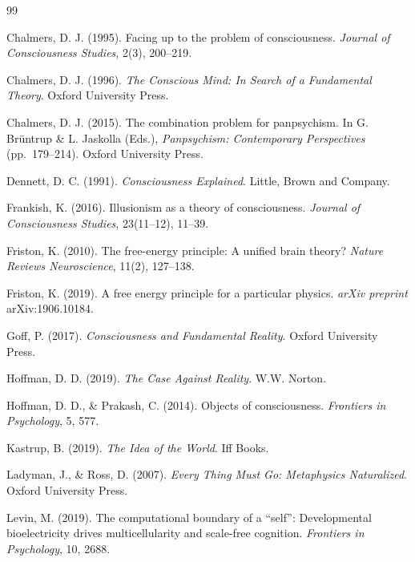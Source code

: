 \documentclass[11pt,a4paper]{article}
\theoremstyle{definition}
\theoremstyle{plain}
\theoremstyle{remark}
\begin{document}
\begin{thebibliography}{99}

 Chalmers, D. J. (1995). Facing up to the problem of consciousness. \textit{Journal of Consciousness Studies}, 2(3), 200--219.

 Chalmers, D. J. (1996). \textit{The Conscious Mind: In Search of a Fundamental Theory}. Oxford University Press.

 Chalmers, D. J. (2015). The combination problem for panpsychism. In G. Br\"untrup \& L. Jaskolla (Eds.), \textit{Panpsychism: Contemporary Perspectives} (pp.~179--214). Oxford University Press.

 Dennett, D. C. (1991). \textit{Consciousness Explained}. Little, Brown and Company.

 Frankish, K. (2016). Illusionism as a theory of consciousness. \textit{Journal of Consciousness Studies}, 23(11--12), 11--39.

 Friston, K. (2010). The free-energy principle: A unified brain theory? \textit{Nature Reviews Neuroscience}, 11(2), 127--138.

 Friston, K. (2019). A free energy principle for a particular physics. \textit{arXiv preprint} arXiv:1906.10184.

 Goff, P. (2017). \textit{Consciousness and Fundamental Reality}. Oxford University Press.

 Hoffman, D. D. (2019). \textit{The Case Against Reality}. W.W. Norton.

 Hoffman, D. D., \& Prakash, C. (2014). Objects of consciousness. \textit{Frontiers in Psychology}, 5, 577.

 Kastrup, B. (2019). \textit{The Idea of the World}. Iff Books.

 Ladyman, J., \& Ross, D. (2007). \textit{Every Thing Must Go: Metaphysics Naturalized}. Oxford University Press.

 Levin, M. (2019). The computational boundary of a ``self'': Developmental bioelectricity drives multicellularity and scale-free cognition. \textit{Frontiers in Psychology}, 10, 2688.


\end{thebibliography}
\end{document}
